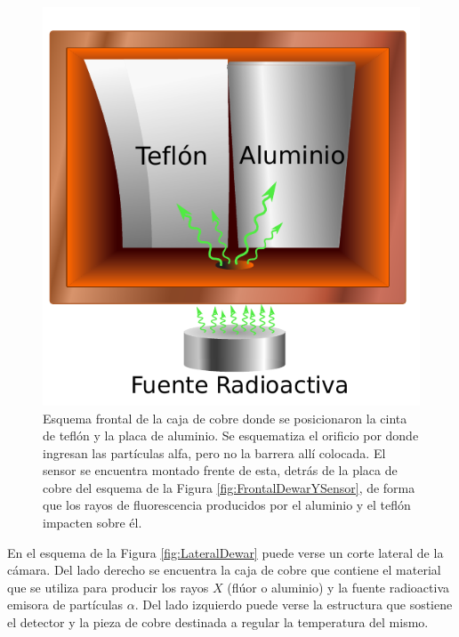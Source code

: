 \begin{figure}[h]
    \centering
    \includegraphics[scale=0.7]{Figs/CajaSensor.pdf}
    \caption{Esquema frontal de la caja de cobre donde se posicionaron la cinta de teflón y la placa de aluminio. Se esquematiza el orificio por donde ingresan las partículas alfa, pero no la barrera allí colocada. El sensor se encuentra montado frente de esta, detrás de la placa de cobre del esquema de la Figura \ref{fig:FrontalDewarYSensor}, de forma que los rayos de fluorescencia producidos por el aluminio y el teflón impacten sobre él.}
    \label{fig:FrontalAlYF}
\end{figure}

En el esquema de la Figura \ref{fig:LateralDewar} puede verse un corte lateral de la cámara. Del lado derecho se encuentra la caja de cobre que contiene el material que se utiliza para producir los rayos $X$ (flúor o aluminio) y la fuente radioactiva emisora de partículas $\alpha$. 
Del lado izquierdo puede verse la estructura que sostiene el detector y la pieza de cobre destinada a regular la temperatura del mismo.

